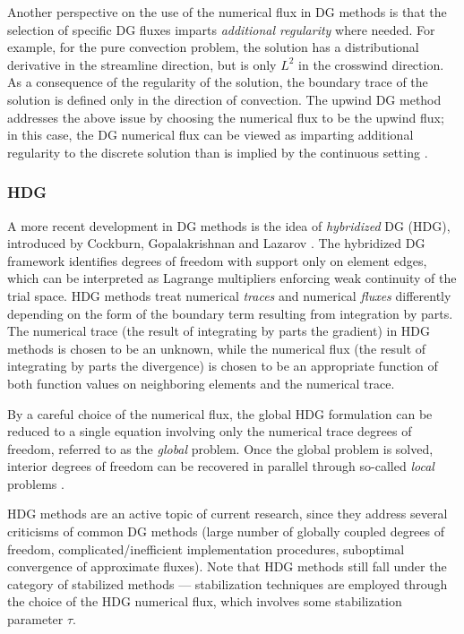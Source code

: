 Another perspective on the use of the numerical flux in DG methods is that the selection of specific DG fluxes imparts \emph{additional regularity} where needed.  For example, for the pure convection problem, the solution has a distributional derivative in the streamline direction, but is only $L^2$ in the crosswind direction. As a consequence of the regularity of the solution, the boundary trace of the solution is defined only in the direction of convection. The upwind DG method addresses the above issue by choosing the numerical flux to be the upwind flux; in this case, the DG numerical flux can be viewed as imparting additional regularity to the discrete solution than is implied by the continuous setting \cite{DPG1,DPG3}.  

\subsubsection{HDG}

A more recent development in DG methods is the idea of \emph{hybridized} DG (HDG), introduced by Cockburn, Gopalakrishnan and Lazarov \cite{hybridDG}. The hybridized DG framework identifies degrees of freedom with support only on element edges, which can be interpreted as Lagrange multipliers enforcing weak continuity of the trial space. HDG methods treat numerical \emph{traces} and numerical \emph{fluxes} differently depending on the form of the boundary term resulting from integration by parts. The numerical trace (the result of integrating by parts the gradient) in HDG methods is chosen to be an unknown, while the numerical flux (the result of integrating by parts the divergence) is chosen to be an appropriate function of both function values on neighboring elements and the numerical trace. 

By a careful choice of the numerical flux, the global HDG formulation can be reduced to a single equation involving only the numerical trace degrees of freedom, referred to as the \emph{global} problem. Once the global problem is solved, interior degrees of freedom can be recovered in parallel through so-called \emph{local} problems \cite{HDGprojection}. 

HDG methods are an active topic of current research, since they address several criticisms of common DG methods (large number of globally coupled degrees of freedom, complicated/inefficient implementation procedures, suboptimal convergence of approximate fluxes). Note that HDG methods still fall under the category of stabilized methods --- stabilization techniques are employed through the choice of the HDG numerical flux, which involves some stabilization parameter $\tau$. 

